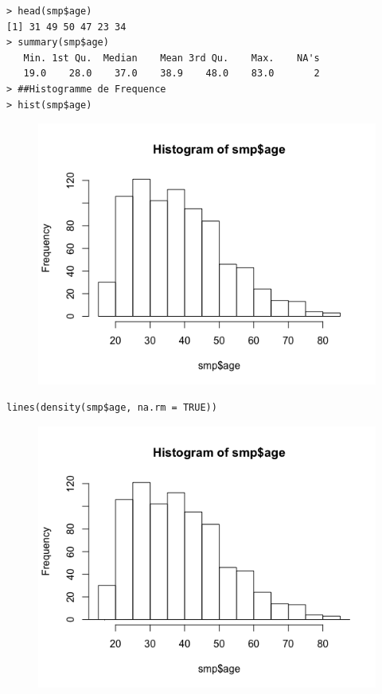 \begin{lstlisting}[language=html]
> head(smp$age)
[1] 31 49 50 47 23 34
> summary(smp$age)
   Min. 1st Qu.  Median    Mean 3rd Qu.    Max.    NA's 
   19.0    28.0    37.0    38.9    48.0    83.0       2 
> ##Histogramme de Frequence
> hist(smp$age)
\end{lstlisting}

\begin{figure}[H]\begin{center}\includegraphics[scale=0.45]{ilu/lab2-4.png}\end{center}\end{figure}

\begin{lstlisting}[language=html]
lines(density(smp$age, na.rm = TRUE))
\end{lstlisting}

\begin{figure}[H]\begin{center}\includegraphics[scale=0.45]{ilu/lab2-5.png}\end{center}\end{figure}

